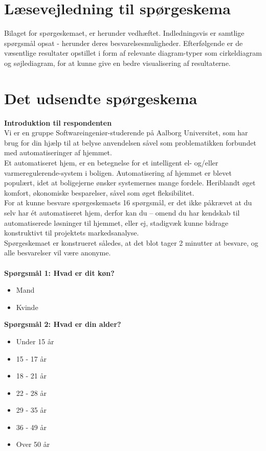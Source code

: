 \label{sec:sporgeskema}
\newcommand{\figurspg}[4]{
		\begin{figure}[H] \centering \em
			\texttt{[image: \#1]}
			\caption{#2}\label{spg:#3}
		\end{figure} 
}

\section*{Læsevejledning til spørgeskema} 
Bilaget for spørgeskemaet, er herunder vedhæftet. Indledningsvis er samtlige spørgsmål opsat - herunder deres besvarelsesmuligheder. Efterfølgende er de væsentlige resultater opstillet i form af relevante diagram-typer som cirkeldiagram og søjlediagram, for at kunne give en bedre visualisering af resultaterne. \\

\section*{Det udsendte spørgeskema} 
{\bf{Introduktion til respondenten}} \\
Vi er en gruppe Softwareingeniør-studerende på Aalborg Universitet, som har brug for din hjælp til at belyse anvendelsen såvel som problematikken forbundet med automatiseringer af hjemmet.\\
Et automatiseret hjem, er en betegnelse for et intelligent el- og/eller varmeregulerende-system i boligen. Automatisering af hjemmet er blevet populært, idet at boligejerne ønsker systemernes mange fordele. Heriblandt øget komfort, økonomiske besparelser, såvel som øget fleksibilitet.\\
For at kunne besvare spørgeskemaets 16 spørgsmål, er det ikke påkrævet at du selv har ét automatiseret hjem, derfor kan du – omend du har kendskab til automatiserede løsninger til hjemmet, eller ej, stadigvæk kunne bidrage konstruktivt til projektets markedsanalyse.\\
Spørgeskemaet er konstrueret således, at det blot tager 2 minutter at besvare, og alle besvarelser vil være anonyme.\\\\
{\bf{Spørgsmål 1: Hvad er dit køn?}}
\begin{itemize}
    \item Mand
    \item Kvinde
\end{itemize}

{\bf{Spørgsmål 2: Hvad er din alder?}}
\begin{itemize}
    \item Under 15 år
    \item 15 - 17 år
    \item 18 - 21 år
    \item 22 - 28 år
    \item 29 - 35 år
    \item 36 - 49 år
    \item Over 50 år
\end{itemize}

